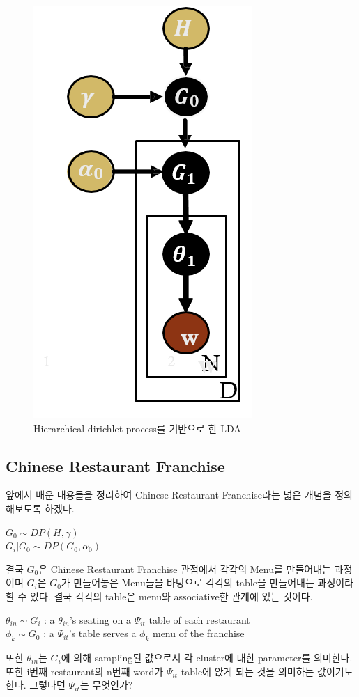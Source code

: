 \documentclass[a4paper]{oblivoir}
\begin{document}
\begin{figure}[ht] \centering 
\begin{center}
\includegraphics[scale=0.6]{fig13_15.png} 
\caption{Hierarchical dirichlet process를 기반으로 한 LDA}
\label{fig:13-17}
\end{center}
\end{figure}

\subsection{Chinese Restaurant Franchise}
앞에서 배운 내용들을 정리하여 Chinese Restaurant Franchise라는 넓은 개념을 정의해보도록 하겠다. 
\begin{center}
    $G_{0} \sim DP(H,\gamma)$\\
    $G_{i}|G_{0} \sim DP(G_{0},\alpha_{0})$\\
\end{center}
결국 $G_{0}$은 Chinese Restaurant Franchise 관점에서 각각의 Menu를 만들어내는 과정이며 $G_{i}$은 $G_{0}$가 만들어놓은 Menu들을 바탕으로 각각의 table을 만들어내는 과정이라 할 수 있다.  결국 각각의 table은 menu와 associative한 관계에 있는 것이다. 
\begin{center}
    $\theta_{in} \sim G_{i}$ : a $\theta_{in}$'s seating on a $\Psi_{it}$ table of each restaurant\\
    $\phi_{k} \sim G_{0}$ : a $\Psi_{it}$'s table serves a $\phi_{k}$ menu of the franchise
\end{center}
또한 $\theta_{in}$는 $G_{i}$에 의해 sampling된 값으로서 각 cluster에 대한 parameter를 의미한다. 또한 i번째 restaurant의 n번째 word가 $\Psi_{it}$ table에 앉게 되는 것을 의미하는 값이기도 한다. 그렇다면 $\Psi_{it}$는 무엇인가? 
\end{document}
